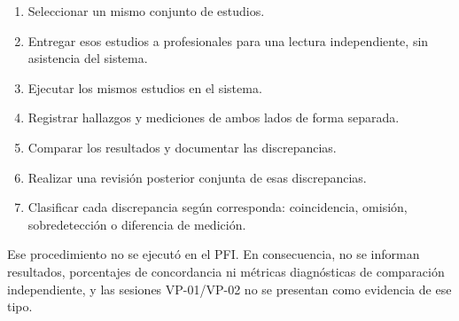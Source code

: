 \begin{enumerate}
    \item Seleccionar un mismo conjunto de estudios.
    \item Entregar esos estudios a profesionales para una lectura independiente, sin asistencia del sistema.
    \item Ejecutar los mismos estudios en el sistema.
    \item Registrar hallazgos y mediciones de ambos lados de forma separada.
    \item Comparar los resultados y documentar las discrepancias.
    \item Realizar una revisión posterior conjunta de esas discrepancias.
    \item Clasificar cada discrepancia según corresponda: coincidencia, omisión, sobredetección o diferencia de medición.
\end{enumerate}

Ese procedimiento no se ejecutó en el PFI. En consecuencia, no se informan resultados, porcentajes de concordancia ni métricas diagnósticas de comparación independiente, y las sesiones VP-01/VP-02 no se presentan como evidencia de ese tipo.
